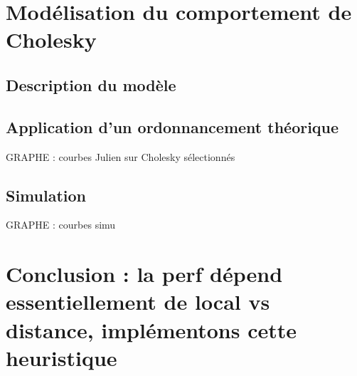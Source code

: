 \section{Modélisation du comportement de Cholesky}
\subsection{Description du modèle}
\subsection{Application d'un ordonnancement théorique}

\begin{todo}
GRAPHE : courbes Julien sur Cholesky sélectionnés
\end{todo}

\subsection{Simulation}

\begin{todo}
GRAPHE : courbes simu
\end{todo}


\section{Conclusion : la perf dépend essentiellement de local vs distance, implémentons cette heuristique}
